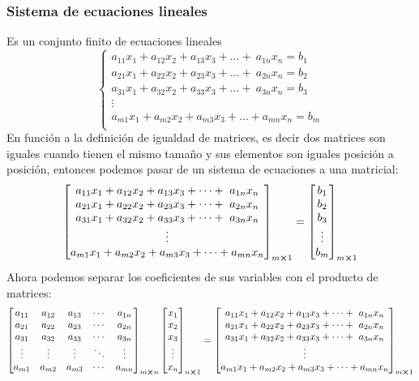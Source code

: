\subsubsection*{Sistema de ecuaciones lineales}
Es un conjunto finito de ecuaciones lineales
$$ \left\{\begin{matrix}
	a_{11}x_1+a_{12}x_2+a_{13}x_3+\dots+ \ a_{1n}x_n=b_1\\
	a_{21}x_1+a_{22}x_2+a_{23}x_3+\dots+ \ a_{2n}x_n=b_2\\
	a_{31}x_1+a_{32}x_2+a_{33}x_3+\dots+ \ a_{3n}x_n=b_3\\
	\vdots\\
	a_{m1}x_1+a_{m2}x_2+a_{m3}x_3+\dots+a_{mn}x_n=b_m\\
\end{matrix}\right. $$
En función a la definición de igualdad de matrices, es decir dos matrices son iguales cuando tienen el mismo tamaño y sus elementos son iguales posición a posición, entonces podemos pasar de un sistema de ecuaciones a una matricial:
$$
	\begin{bmatrix}
		a_{11}x_1+a_{12}x_2+a_{13}x_3+\dots+ \ a_{1n}x_n\\
		a_{21}x_1+a_{22}x_2+a_{23}x_3+\dots+ \ a_{2n}x_n\\
		a_{31}x_1+a_{32}x_2+a_{33}x_3+\dots+ \ a_{3n}x_n\\
		\vdots\\
		a_{m1}x_1+a_{m2}x_2+a_{m3}x_3+\dots+a_{mn}x_n\\
	\end{bmatrix}_{m\cross 1}=\begin{bmatrix}
		b_1\\
		b_2\\
		b_3\\
		\vdots\\
		b_m
	\end{bmatrix}_{m\cross 1}
$$
Ahora podemos separar los coeficientes de sus variables con el producto de matrices:
$$
	\begin{bmatrix}
		a_{11}&a_{12}&a_{13}&\cdots&a_{1n}\\
		a_{21}&a_{22}&a_{23}&\cdots&a_{2n}\\
		a_{31}&a_{32}&a_{33}&\cdots&a_{3n}\\
		\vdots&\vdots&\vdots&\ddots&\vdots\\
		a_{m1}&a_{m2}&a_{m3}&\cdots&a_{mn}\\
	\end{bmatrix}_{m\cross n}\begin{bmatrix}
		x_1\\
		x_2\\
		x_3\\
		\vdots\\
		x_n
	\end{bmatrix}_{n\cross 1}=\begin{bmatrix}
		a_{11}x_1+a_{12}x_2+a_{13}x_3+\dots+ \ a_{1n}x_n\\
		a_{21}x_1+a_{22}x_2+a_{23}x_3+\dots+ \ a_{2n}x_n\\
		a_{31}x_1+a_{32}x_2+a_{33}x_3+\dots+ \ a_{3n}x_n\\
		\vdots\\
		a_{m1}x_1+a_{m2}x_2+a_{m3}x_3+\dots+a_{mn}x_n\\
	\end{bmatrix}_{m\cross 1}
$$
